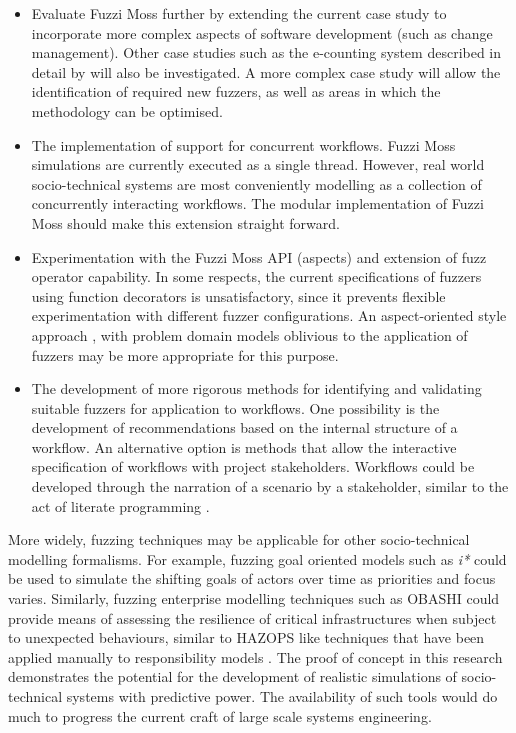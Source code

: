 \documentclass{sig-alternate}
\begin{document}
\begin{itemize}

\item Evaluate Fuzzi Moss further by extending the current case study to incorporate more complex aspects of software
  development (such as change management). Other case studies such as the e-counting system described in detail by
  \citet{lock07observations} will also be investigated.  A more complex case study will allow the identification of
  required new fuzzers, as well as areas in which the methodology can be optimised.

\item The implementation of support for concurrent workflows.  Fuzzi Moss simulations are currently executed as a single
  thread.  However, real world socio-technical systems are most conveniently modelling as a collection of concurrently
  interacting workflows.  The modular implementation of Fuzzi Moss should make this extension straight forward.

\item Experimentation with the Fuzzi Moss API (aspects) and extension of fuzz operator capability.  In some respects,
  the current specifications of fuzzers using function decorators is unsatisfactory, since it prevents flexible
  experimentation with different fuzzer configurations.  An aspect-oriented style approach \citep{filman01aspect}, with
  problem domain models oblivious to the application of fuzzers may be more appropriate for this purpose.

\item The development of more rigorous methods for identifying and validating suitable fuzzers for application to
  workflows.  One possibility is the development of recommendations based on the internal structure of a workflow.  An
  alternative option is methods that allow the interactive specification of workflows with project stakeholders.
  Workflows could be developed through the narration of a scenario by a stakeholder, similar to the act of literate
  programming \cite{knuth84literate}.

\end{itemize}

More widely, fuzzing techniques may be applicable for other socio-technical modelling formalisms.  For example, fuzzing
goal oriented models such as \emph{i*} could be used to simulate the shifting goals of actors over time as priorities
and focus varies.  Similarly, fuzzing enterprise modelling techniques such as OBASHI could provide means of assessing
the resilience of critical infrastructures when subject to unexpected behaviours, similar to HAZOPS like techniques that
have been applied manually to responsibility models \cite{lock09modelling}. The proof of concept in this research
demonstrates the potential for the development of realistic simulations of socio-technical systems with predictive
power.  The availability of such tools would do much to progress the current craft of large scale systems engineering.


 


\end{document}
